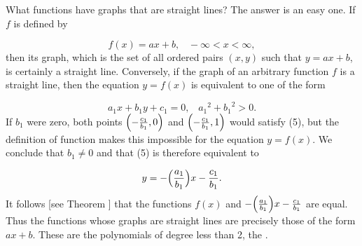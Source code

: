 What functions have graphs that are straight lines? The answer is an easy one.
If $f$ is defined by

\[
f(x) = ax + b,    \;\;\;   - \infty < x < \infty,
\]
then its graph, which is the set of all ordered pairs $(x, y)$
such that $y = ax + b$, is certainly a straight line.
Conversely, if the graph of an arbitrary function $f$ is a straight line, then the equation $y = f(x)$ is equivalent to one of the form

\begin{equation}
a_{1}x + b_{1}y + c_1 = 0,  \;\;\;  {a_1}^2 + {b_1}^2 > 0.
\label{eq1.5.5}
\end{equation}
If $b_1$ were zero, both points $\Bigl( - \frac{c_1}{b_1}, 0 \Bigr)$ and $\Bigl( -\frac{ c_1}{b_1}, 1 \Bigr)$ would satisfy (5),  but the definition of function makes this impossible for the equation $y = f(x)$.
We conclude that $b_1 \neq 0$  and that (5) is therefore equivalent to

\[
y = - \Bigl(\frac{a_1}{b_1} \Bigr) x - \frac{c_1}{b_1}.
\]
It follows [see Theorem ]
that the functions $f(x)$ and
$-\Bigl( \frac{a_1}{b_1} \Bigr) x -\frac{c_1}{b_1}$ are equal.
Thus the functions whose graphs are straight lines
are precisely those of the form $ax + b$.
These are the polynomials of degree less than 2,
the .
